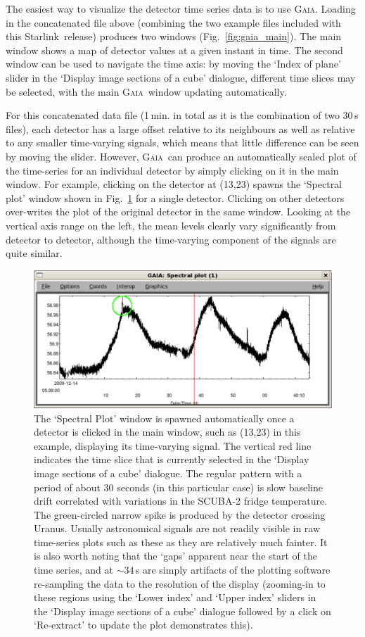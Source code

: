 \documentclass[twoside,11pt]{article}
\newcommand{\starlink}{\htmladdnormallink{Starlink}{http://starlink.jach.hawaii.edu}}
\newcommand{\gaia}{\xref{\textsc{Gaia}}{sun214}{}}
\newcommand{\htmladdnormallink}[2]{#1}
\newcommand{\xref}[3]{#1}
\renewcommand{\_}{\texttt{\symbol{95}}}
\begin{document}
The easiest way to visualize the detector time series data is to use
\gaia. Loading in the concatenated file above (combining the two
example files included with this \starlink\ release) produces two
windows (Fig.~\ref{fig:gaia_main}). The main window shows a map of
detector values at a given instant in time. The second window can be
used to navigate the time axis: by moving the `Index of plane' slider
in the `Display image sections of a cube' dialogue, different time
slices may be selected, with the main \gaia\ window updating
automatically.

For this concatenated data file (1\,min. in total as it is the
combination of two 30\,s files), each detector has a large offset
relative to its neighbours as well as relative to any smaller
time-varying signals, which means that little difference can be seen
by moving the slider. However, \gaia\ can produce an automatically
scaled plot of the time-series for an individual detector by simply
clicking on it in the main window. For example, clicking on the
detector at (13,23) spawns the `Spectral plot' window shown in
Fig.~\ref{fig:gaia_spec} for a single detector. Clicking on other
detectors over-writes the plot of the original detector in the same
window. Looking at the vertical axis range on the left, the mean
levels clearly vary significantly from detector to detector, although
the time-varying component of the signals are quite similar.

\begin{figure}
\begin{center}
\includegraphics[width=0.7\linewidth]{sc19_gaia_spec}
\caption{The `Spectral Plot' window is spawned automatically once a
  detector is clicked in the main window, such as (13,23) in this
  example, displaying its time-varying signal. The vertical red line
  indicates the time slice that is currently selected in the `Display
  image sections of a cube' dialogue. The regular pattern with a
  period of about 30 seconds (in this particular case) is slow
  baseline drift correlated with variations in the SCUBA-2 fridge
  temperature. The green-circled narrow spike is produced by the
  detector crossing Uranus. Usually astronomical signals are not
  readily visible in raw time-series plots such as these as they are
  relatively much fainter. It is also worth noting that the `gaps'
  apparent near the start of the time series, and at $\sim34$\,s are
  simply artifacts of the plotting software re-sampling the data to
  the resolution of the display (zooming-in to these regions using the
  `Lower index' and `Upper index' sliders in the `Display image
  sections of a cube' dialogue followed by a click on `Re-extract' to
  update the plot demonstrates this).  }
\label{fig:gaia_spec}
\end{center}
\end{figure}
\end{document}
